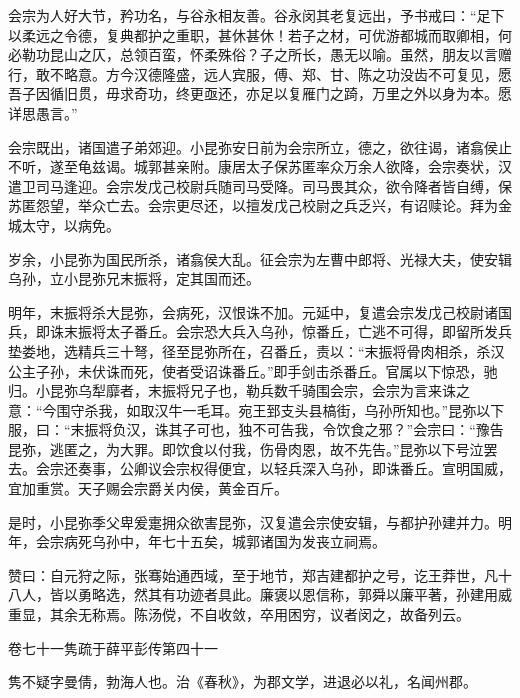 \documentclass[12pt,UTF8]{ctexbook}
\begin{document}
会宗为人好大节，矜功名，与谷永相友善。谷永闵其老复远出，予书戒曰：“足下以柔远之令德，复典都护之重职，甚休甚休！若子之材，可优游都城而取卿相，何必勒功昆山之仄，总领百蛮，怀柔殊俗？子之所长，愚无以喻。虽然，朋友以言赠行，敢不略意。方今汉德隆盛，远人宾服，傅、郑、甘、陈之功没齿不可复见，愿吾子因循旧贯，毋求奇功，终更亟还，亦足以复雁门之踦，万里之外以身为本。愿详思愚言。”



会宗既出，诸国遣子弟郊迎。小昆弥安日前为会宗所立，德之，欲往谒，诸翕侯止不听，遂至龟兹谒。城郭甚亲附。康居太子保苏匿率众万余人欲降，会宗奏状，汉遣卫司马逢迎。会宗发戊己校尉兵随司马受降。司马畏其众，欲令降者皆自缚，保苏匿怨望，举众亡去。会宗更尽还，以擅发戊己校尉之兵乏兴，有诏赎论。拜为金城太守，以病免。



岁余，小昆弥为国民所杀，诸翕侯大乱。征会宗为左曹中郎将、光禄大夫，使安辑乌孙，立小昆弥兄末振将，定其国而还。



明年，末振将杀大昆弥，会病死，汉恨诛不加。元延中，复遣会宗发戊己校尉诸国兵，即诛末振将太子番丘。会宗恐大兵入乌孙，惊番丘，亡逃不可得，即留所发兵垫娄地，选精兵三十弩，径至昆弥所在，召番丘，责以：“末振将骨肉相杀，杀汉公主子孙，未伏诛而死，使者受诏诛番丘。”即手剑击杀番丘。官属以下惊恐，驰归。小昆弥乌犁靡者，末振将兄子也，勒兵数千骑围会宗，会宗为言来诛之意：“今围守杀我，如取汉牛一毛耳。宛王郅支头县槁街，乌孙所知也。”昆弥以下服，曰：“末振将负汉，诛其子可也，独不可告我，令饮食之邪？”会宗曰：“豫告昆弥，逃匿之，为大罪。即饮食以付我，伤骨肉恩，故不先告。”昆弥以下号泣罢去。会宗还奏事，公卿议会宗权得便宜，以轻兵深入乌孙，即诛番丘。宣明国威，宜加重赏。天子赐会宗爵关内侯，黄金百斤。



是时，小昆弥季父卑爰疐拥众欲害昆弥，汉复遣会宗使安辑，与都护孙建并力。明年，会宗病死乌孙中，年七十五矣，城郭诸国为发丧立祠焉。



赞曰：自元狩之际，张骞始通西域，至于地节，郑吉建都护之号，讫王莽世，凡十八人，皆以勇略选，然其有功迹者具此。廉褒以恩信称，郭舜以廉平著，孙建用威重显，其余无称焉。陈汤傥，不自收敛，卒用困穷，议者闵之，故备列云。





卷七十一隽疏于薛平彭传第四十一



隽不疑字曼倩，勃海人也。治《春秋》，为郡文学，进退必以礼，名闻州郡。
\end{document}
